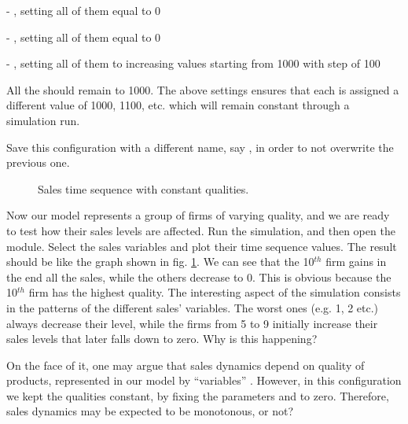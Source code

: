 \documentclass [11pt,a4paper] {book}
\begin{document}
- , setting all of them equal to 0

- , setting all of them equal to 0

- , setting all of them to increasing values starting from 1000 with
step of 100

All the  should remain to 1000. The above settings ensures that each
 is assigned a different value of 1000, 1100, etc. which will remain
constant through a simulation run. 

Save this configuration with a different name, say , in order to not overwrite the previous one.


\begin{figure}[ht]
  \centering
  \caption{Sales time sequence with constant qualities.}
  \label{fig:sales}
\end{figure}

Now our model represents a group of firms of varying quality, and we are ready to test
how their sales levels are affected. Run the simulation, and then open the  module. Select the sales variables and plot their time sequence values. The
result should be like the graph shown in fig. \ref{fig:sales}. We can see that the
10$^{th}$ firm gains in the end all the sales, while the others decrease to 0. This is
obvious because the 10$^{th}$ firm has the highest quality. The interesting aspect of the
simulation consists in the patterns of the different sales' variables. The worst ones
(e.g. 1, 2 etc.) always decrease their level, while the firms from 5 to 9 initially
increase their sales levels that later falls down to zero. Why is this happening? 

On the face of it, one may argue that sales dynamics depend on quality of products, represented in our model by ``variables'' . However, in this configuration we kept the qualities constant, by fixing the parameters  and  to zero. Therefore, sales dynamics may be expected to be monotonous, or not? 
\end{document}
